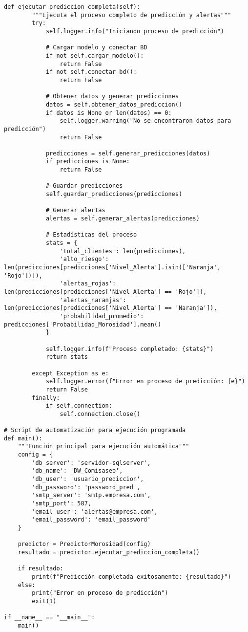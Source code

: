 \begin{verbatim}
def ejecutar_prediccion_completa(self):
        """Ejecuta el proceso completo de predicción y alertas"""
        try:
            self.logger.info("Iniciando proceso de predicción")
            
            # Cargar modelo y conectar BD
            if not self.cargar_modelo():
                return False
            if not self.conectar_bd():
                return False
            
            # Obtener datos y generar predicciones
            datos = self.obtener_datos_prediccion()
            if datos is None or len(datos) == 0:
                self.logger.warning("No se encontraron datos para predicción")
                return False
            
            predicciones = self.generar_predicciones(datos)
            if predicciones is None:
                return False
            
            # Guardar predicciones
            self.guardar_predicciones(predicciones)
            
            # Generar alertas
            alertas = self.generar_alertas(predicciones)
            
            # Estadísticas del proceso
            stats = {
                'total_clientes': len(predicciones),
                'alto_riesgo': len(predicciones[predicciones['Nivel_Alerta'].isin(['Naranja', 'Rojo'])]),
                'alertas_rojas': len(predicciones[predicciones['Nivel_Alerta'] == 'Rojo']),
                'alertas_naranjas': len(predicciones[predicciones['Nivel_Alerta'] == 'Naranja']),
                'probabilidad_promedio': predicciones['Probabilidad_Morosidad'].mean()
            }
            
            self.logger.info(f"Proceso completado: {stats}")
            return stats
            
        except Exception as e:
            self.logger.error(f"Error en proceso de predicción: {e}")
            return False
        finally:
            if self.connection:
                self.connection.close()

# Script de automatización para ejecución programada
def main():
    """Función principal para ejecución automática"""
    config = {
        'db_server': 'servidor-sqlserver',
        'db_name': 'DW_Comisaseo',
        'db_user': 'usuario_prediccion',
        'db_password': 'password_pred',
        'smtp_server': 'smtp.empresa.com',
        'smtp_port': 587,
        'email_user': 'alertas@empresa.com',
        'email_password': 'email_password'
    }
    
    predictor = PredictorMorosidad(config)
    resultado = predictor.ejecutar_prediccion_completa()
    
    if resultado:
        print(f"Predicción completada exitosamente: {resultado}")
    else:
        print("Error en proceso de predicción")
        exit(1)

if __name__ == "__main__":
    main()
\end{verbatim}
